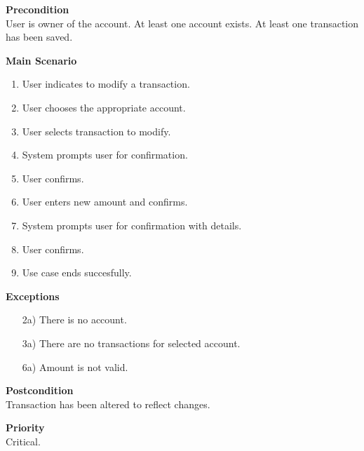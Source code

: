 \documentclass[12pt]{article}
\begin{document}
\noindent
{\bf Precondition}\\
User is owner of the account.
At least one account exists.
At least one transaction has been saved.

\noindent
{\bf Main Scenario}\\
\vspace*{-0.2in}
\begin{enumerate}
  \item User indicates to modify a transaction.
  \item User chooses the appropriate account.
  \item User selects transaction to modify.
  \item System prompts user for confirmation.
  \item User confirms.
  \item User enters new amount and confirms.
  \item System prompts user for confirmation with details.
  \item User confirms.
  \item Use case ends succesfully.
\end{enumerate}

\noindent
    {\bf Exceptions}\\
    \vspace{-0.2in}
    \begin{itemize}
    \item[2a)] There is no account.
    \item[3a)] There are no transactions for selected account.
    \item[6a)] Amount is not valid.
    \end{itemize}

\noindent
    {\bf Postcondition}\\
    Transaction has been altered to reflect changes.

\noindent
{\bf Priority}\\
Critical.

\end{document}
